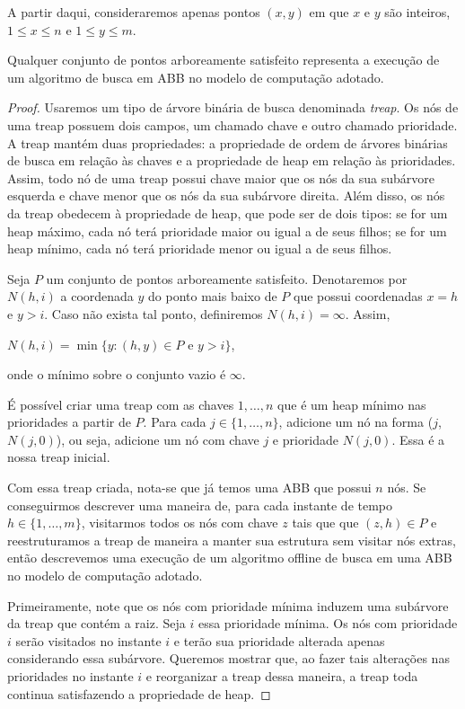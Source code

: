 A partir daqui, consideraremos apenas pontos $(x,y)$ em que $x$ e $y$ são inteiros, $1 \leq x \leq n$ e $1 \leq y \leq m$.

\begin{lemma}Qualquer conjunto de pontos arboreamente satisfeito representa a execução de um algoritmo de busca em ABB no modelo de computação adotado.
\label{lema:ASS_vira_visao_geometrica}
\end{lemma}

\begin{proof}\label{prova:ASS}
Usaremos um tipo de árvore binária de busca denominada \textit{treap}. Os nós de uma treap possuem dois campos, um chamado chave e outro chamado prioridade. A treap mantém duas propriedades: a propriedade de ordem de árvores binárias de busca em relação às chaves e a propriedade de heap em relação às prioridades. Assim, todo nó de uma treap possui chave maior que os nós da sua subárvore esquerda e chave menor que os nós da sua subárvore direita. Além disso, os nós da treap obedecem à propriedade de heap, que pode ser de dois tipos: se for um heap máximo, cada nó terá prioridade maior ou igual a de seus filhos; se for um heap mínimo, cada nó terá prioridade menor ou igual a de seus filhos.

Seja $P$ um conjunto de pontos arboreamente satisfeito. Denotaremos por $N(h,i)$ a coordenada $y$ do ponto mais baixo de $P$ que possui coordenadas $x = h$ e $y > i$. Caso não exista tal ponto, definiremos $N(h,i) = \infty$. Assim, 
\begin{center}
    $N(h,i) = \min\{y : (h,y) \in P \text{ e } y > i\}$,
\end{center}
onde o mínimo sobre o conjunto vazio é $\infty$.

É possível criar uma treap com as chaves $1,\ldots,n$ que é um heap mínimo nas prioridades a partir de $P$. Para cada $j \in \{1,\ldots,n\}$, adicione um nó na forma ($j$, $N(j,0)$), ou seja, adicione um nó com chave $j$ e prioridade $N(j,0)$. Essa é a nossa treap inicial.

Com essa treap criada, nota-se que já temos uma ABB que possui $n$ nós. Se conseguirmos descrever uma maneira de, para cada instante de tempo $h \in \{1,\ldots,m\}$, visitarmos todos os nós com chave $z$ tais que que $(z,h) \in P$ e reestruturamos a treap de maneira a manter sua estrutura sem visitar nós extras, então descrevemos uma execução de um algoritmo offline de busca em uma ABB no modelo de computação adotado.

Primeiramente, note que os nós com prioridade mínima induzem uma subárvore da treap que contém a raiz.
Seja $i$ essa prioridade mínima. Os nós com prioridade $i$ serão visitados no instante $i$ e terão sua prioridade alterada apenas considerando essa subárvore. Queremos mostrar que, ao fazer tais alterações nas prioridades no instante $i$ e reorganizar a treap dessa maneira, a treap toda continua satisfazendo a propriedade de heap.


\end{proof}
